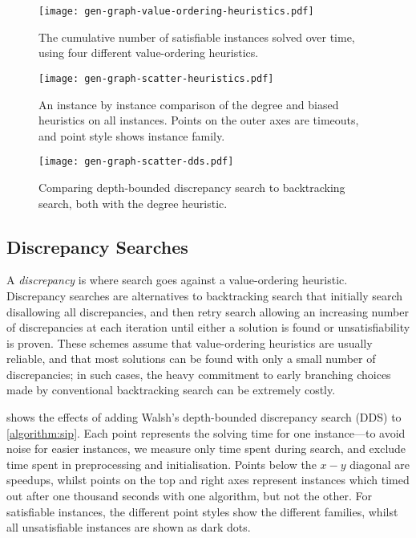 \documentclass[letterpaper]{article} %
\begin{document}
\begin{figure}[p]
    \centering
    \texttt{[image: gen-graph-value-ordering-heuristics.pdf]}

    \caption{The cumulative number of satisfiable instances solved over time, using four
    different value-ordering heuristics.}
    \label{figure:value-ordering-heuristics}
\end{figure}

\begin{figure}[p]
    \centering
    \texttt{[image: gen-graph-scatter-heuristics.pdf]}

    \caption{An instance by instance comparison of the degree and biased heuristics on all
    instances. Points on the outer axes are timeouts, and point style shows instance family.}
    \label{figure:scatter-heuristics}
\end{figure}

\begin{figure}[p]
    \centering
    \texttt{[image: gen-graph-scatter-dds.pdf]}

    \caption{Comparing depth-bounded discrepancy search to backtracking search, both with the degree
    heuristic.}\label{figure:scatter-dds}
\end{figure}

\subsection{Discrepancy Searches}

A \emph{discrepancy} is where search goes against a value-ordering heuristic.  Discrepancy searches
\cite{DBLP:conf/ijcai/HarveyG95,DBLP:conf/aaai/Korf96,DBLP:conf/ijcai/Walsh97} are alternatives to
backtracking search that initially search disallowing all discrepancies, and then retry search
allowing an increasing number of discrepancies at each iteration until either a solution is found or
unsatisfiability is proven. These schemes assume that value-ordering heuristics are usually
reliable, and that most solutions can be found with only a small number of discrepancies; in such
cases, the heavy commitment to early branching choices made by conventional backtracking search can
be extremely costly.

 shows the effects of adding Walsh's \cite{DBLP:conf/ijcai/Walsh97}
depth-bounded discrepancy search (DDS) to \cref{algorithm:sip}. Each point represents the solving
time for one instance---to avoid noise for easier instances, we measure only time spent during
search, and exclude time spent in preprocessing and initialisation.  Points below the $x-y$ diagonal
are speedups, whilst points on the top and right axes represent instances which timed out after one
thousand seconds with one algorithm, but not the other. For satisfiable instances, the different
point styles show the different families, whilst all unsatisfiable instances are shown as dark dots.
\end{document}
